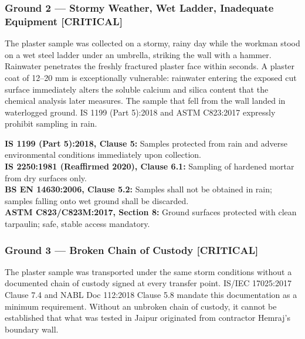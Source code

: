 \documentclass[12pt, a4paper]{article}
\begin{document}
\subsubsection{Ground 2 --- Stormy Weather, Wet Ladder, Inadequate Equipment \textbf{[CRITICAL]}}

\begin{groundbox}
The plaster sample was collected on a stormy, rainy day while the workman stood on a wet steel ladder under an umbrella, striking the wall with a hammer. Rainwater penetrates the freshly fractured plaster face within seconds. A plaster coat of 12--20 mm is exceptionally vulnerable: rainwater entering the exposed cut surface immediately alters the soluble calcium and silica content that the chemical analysis later measures. The sample that fell from the wall landed in waterlogged ground. IS 1199 (Part 5):2018 and ASTM C823:2017 expressly prohibit sampling in rain.
\end{groundbox}

\begin{standardbox}
\textbf{IS 1199 (Part 5):2018, Clause 5:} Samples protected from rain and adverse environmental conditions immediately upon collection.\\
\textbf{IS 2250:1981 (Reaffirmed 2020), Clause 6.1:} Sampling of hardened mortar from dry surfaces only.\\
\textbf{BS EN 14630:2006, Clause 5.2:} Samples shall not be obtained in rain; samples falling onto wet ground shall be discarded.\\
\textbf{ASTM C823/C823M:2017, Section 8:} Ground surfaces protected with clean tarpaulin; safe, stable access mandatory.
\end{standardbox}

\subsubsection{Ground 3 --- Broken Chain of Custody \textbf{[CRITICAL]}}

\begin{groundbox}
The plaster sample was transported under the same storm conditions without a documented chain of custody signed at every transfer point. IS/IEC 17025:2017 Clause 7.4 and NABL Doc 112:2018 Clause 5.8 mandate this documentation as a minimum requirement. Without an unbroken chain of custody, it cannot be established that what was tested in Jaipur originated from contractor Hemraj's boundary wall.
\end{groundbox}
\end{document}
